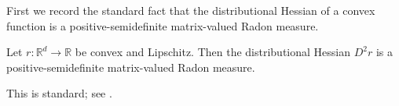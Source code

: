 \documentclass[12pt,cleveref]{jmlr}
\renewenvironment{proof}[1][\proofname]
{\par\noindent{\bfseries\upshape #1\ }}
{\jmlrQED}
\newcommand{\R}{\mathbb R}
\newcommand{\E}{\mathbb E}
\newcommand{\N}{\mathcal N}
\newcommand{\1}{\mathbf 1}
\begin{document}
First we record the standard fact that the distributional Hessian of a convex function is a positive-semidefinite matrix-valued Radon measure.
\begin{lemma}
    \label{lem:convex-hessian-measure}
    Let $r:\R^d\to\R$ be convex and Lipschitz.
    Then the distributional Hessian $D^2r$ is a positive-semidefinite
    matrix-valued Radon measure.
\end{lemma}
\begin{proof}
    This is standard; see \citet[Section~6.3]{evansgariepy2015measure}.
\end{proof}
\end{document}
